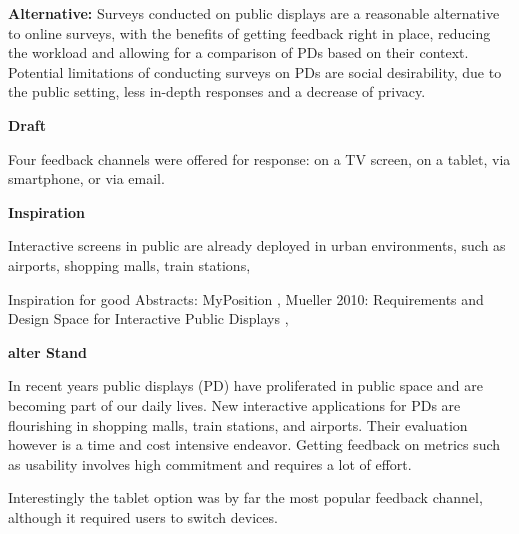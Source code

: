 \clearpage

	\textbf{Alternative:} Surveys conducted on public displays are a reasonable alternative to online surveys, with the benefits of getting feedback right in place, reducing the workload and allowing for a comparison of PDs based on their context. Potential limitations of conducting surveys on PDs are social desirability, due to the public setting, less in-depth responses and a decrease of privacy.




\textbf{Draft}

	Four feedback channels were offered for response: on a TV screen, on a tablet, via smartphone, or via email.


\textbf{Inspiration}

	Interactive screens in public are already deployed in urban environments, such as airports, shopping malls, train stations, 

	Inspiration for good Abstracts: MyPosition \cite{valkanova2014myposition}, 
	Mueller 2010: Requirements and Design Space for Interactive Public Displays \cite{muller2010requirements}, 


\textbf{alter Stand}

	In recent years public displays (PD) have proliferated in public space and are becoming part of our daily lives. New interactive applications for PDs are flourishing in shopping malls, train stations, and airports. Their evaluation however is a time and cost intensive endeavor. 
	Getting feedback on metrics such as usability involves high commitment and requires a lot of effort.

	Interestingly the tablet option was by far the most popular feedback channel, although it required users to switch devices. 


